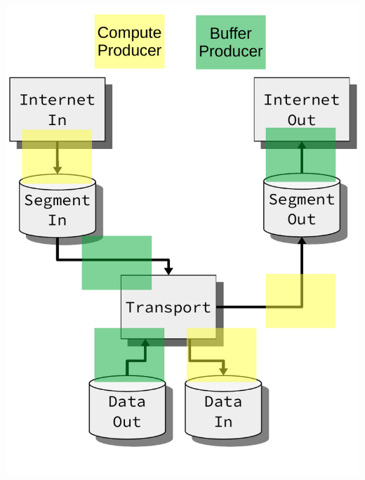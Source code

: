 \begin{frame}[fragile]
\centering
\includegraphics[scale=0.40]{implementation/signal_protocol_identification.pdf}

\end{frame}

